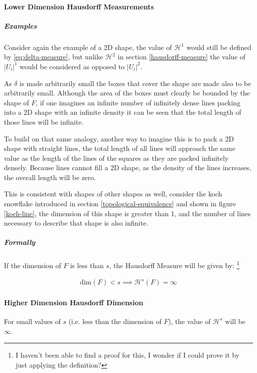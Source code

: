 \documentclass[11pt]{article}
\begin{document}
\paragraph{Lower Dimension Hausdorff Measurements}
\label{sec:org7dbe146}
\subparagraph{Examples}
\label{sec:org78945fa}
Consider again the example of a 2D shape, the value of \(\mathcal{H}^{1}\) would still be defined by \eqref{eq:delta-measure}, but unlike \(\mathcal{H}^{2}\) in section \ref{hausdorff-measure} the value of \(\left\lvert U_i \right\rvert^1\) would be considered as opposed to \(\left\lvert U_i \right\rvert^2\).

As \(\delta\) is made arbitrarily small the boxes that cover the shape are made also to be arbitrarily small. Although the area of the boxes must clearly be bounded by the shape of \(F\), if one imagines an infinite number of infinitely dense lines packing into a 2D shape with an infinite density it can be seen that the total length of those lines will be infinite.

To build on that same analogy, another way to imagine this is to pack a 2D shape with straight lines, the total length of all lines will approach the same value as the length of the lines of the squares as they are packed infinitely densely. Because lines cannot fill a 2D shape, as the density of the lines increases, the overall length will be zero.

This is consistent with shapes of other shapes as well, consider the koch snowflake introduced in section \ref{topological-equivalence} and shown in figure \ref{koch-line}, the dimension of this shape is greater than 1, and the number of lines necessary to describe that shape is also infinite.

\subparagraph{Formally}
\label{sec:orge840e01}
If the dimension of \(F\) is less than \(s\), the Hausdorff Measure will be given by: \footnote{I haven't been able to find a proof for this, I wonder if I could prove it by just applying the definition?}

\begin{align}
\mathrm{dim}\left(  F \right ) < s \implies \mathcal{H}^{s} \left( F \right)  = \infty
\end{align}

\paragraph{Higher Dimension Hausdorff Dimension}
\label{sec:orgd0b1c21}
For small values of \(s\) (i.e. less than the dimension of  \(F\)), the value of \(\mathcal{H}^s\)  will be \(\infty\).
\end{document}
